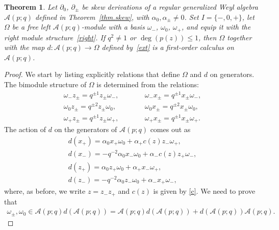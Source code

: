 \documentclass[pdftex]{sigma}
\numberwithin{equation}{section}
\newtheorem{Theorem}{Theorem}[section]
\def\AWeyl#1#2{{\mathcal{A}}(#1;#2)}
\begin{document}
\begin{Theorem}\label{thm.calc.A}
Let $\partial_0$, $\partial_\pm$ be skew derivations of a regular generalized Weyl algebra $\AWeyl p q$ defined in Theorem~{\rm \ref{thm.skew}}, with $\alpha_0, \alpha_\pm \neq 0$. Set $I = \{-,0,+\}$, let $\Omega$ be a free left $\AWeyl p q$-module with a basis $\omega_-$, $\omega_0$, $\omega_+$, and equip it with the right module structure~\eqref{right}. If $q^2 \neq 1$ or $\deg(p(z))\leq 1$, then $\Omega$ together with the map $d\colon \AWeyl p q\to \Omega$ defined by~\eqref{ext} is a first-order calculus on~$\AWeyl p q$.
\end{Theorem}

\begin{proof}
We start by listing explicitly relations that def\/ine $\Omega$ and $d$ on generators. The bimodule structure of $\Omega$ is determined from the relations:
\begin{subequations}\label{omegas}
\begin{alignat}{3}
& \omega_- z_\pm = q^{\pm 1} z_\pm\omega_-, \qquad && \omega_- x_\pm = q^{\pm 1} x_\pm \omega_-,&\label{omega-}
\\
& \omega_0 z_\pm = q^{\pm 2} z_\pm\omega_0, \qquad && \omega_0 x_\pm = q^{\pm 2} x_\pm\omega_0 ,&\label{omega0}
\\
& \omega_+z_\pm = q^{\pm 1} z_\pm\omega_+, \qquad && \omega_+ x_\pm = q^{\pm 1} x_\pm \omega_+. &\label{omega+}
\end{alignat}
\end{subequations}
The action of $d$ on the generators of $\AWeyl p q$ comes out as
\begin{subequations}\label{d.gen}
\begin{gather}
d(x_+) = \alpha_0 x_+ \omega_0 + \alpha_+c(z)z_- \omega_+, \label{dx+}
\\
d(x_-) = -q^{-2}\alpha_0 x_- \omega_0 + \alpha_-c(z)z_+\omega_-, \label{dx-}
\\
d(z_+) = \alpha_0 z_+ \omega_0 + \alpha_+x_- \omega_+, \label{dz+}
\\
d(z_-) = -q^{-2}\alpha_0 z_- \omega_0 + \alpha_-x_+ \omega_-, \label{dz-}
\end{gather}
\end{subequations}
where, as before, we write $z = z_-z_+$ and $c(z)$ is given by \eqref{c}.
We need to prove that
\begin{gather*}
\omega_\pm, \omega_0\in \AWeyl p q d (\AWeyl p q ) = \AWeyl p q d (\AWeyl p q )+ d (\AWeyl p q ) \AWeyl p q .
\end{gather*}

\end{proof}
\end{document}
